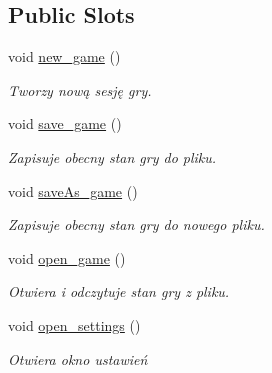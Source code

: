 \subsection*{Public Slots}
\begin{DoxyCompactItemize}
\item 
\mbox{\label{classchess_game_a230eb38f254315b36cd363d9934d4945}} 
void \hyperlink{classchess_game_a230eb38f254315b36cd363d9934d4945}{new\+\_\+game} ()
\begin{DoxyCompactList}\small\item\em Tworzy nową sesję gry. \end{DoxyCompactList}\item 
\mbox{\label{classchess_game_a5aa2f3514c1ef832a80ab5a10288c20e}} 
void \hyperlink{classchess_game_a5aa2f3514c1ef832a80ab5a10288c20e}{save\+\_\+game} ()
\begin{DoxyCompactList}\small\item\em Zapisuje obecny stan gry do pliku. \end{DoxyCompactList}\item 
\mbox{\label{classchess_game_aff9965791d6a11efb08d6c483db6371b}} 
void \hyperlink{classchess_game_aff9965791d6a11efb08d6c483db6371b}{save\+As\+\_\+game} ()
\begin{DoxyCompactList}\small\item\em Zapisuje obecny stan gry do nowego pliku. \end{DoxyCompactList}\item 
\mbox{\label{classchess_game_a5e8b9a01b5d091579e7f13fe742c85b1}} 
void \hyperlink{classchess_game_a5e8b9a01b5d091579e7f13fe742c85b1}{open\+\_\+game} ()
\begin{DoxyCompactList}\small\item\em Otwiera i odczytuje stan gry z pliku. \end{DoxyCompactList}\item 
\mbox{\label{classchess_game_af4636d3a148b8e910ac093bf419fbac7}} 
void \hyperlink{classchess_game_af4636d3a148b8e910ac093bf419fbac7}{open\+\_\+settings} ()
\begin{DoxyCompactList}\small\item\em Otwiera okno ustawień \end{DoxyCompactList}\item 

\end{DoxyCompactItemize}

